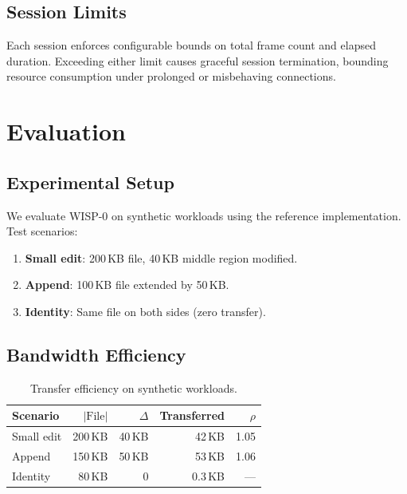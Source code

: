 \documentclass[11pt,twocolumn]{article}
\theoremstyle{definition}
\begin{document}
\subsection{Session Limits}

Each session enforces configurable bounds on total frame count and
elapsed duration. Exceeding either limit causes graceful session
termination, bounding resource consumption under prolonged or
misbehaving connections.


\section{Evaluation}
\label{sec:evaluation}

\subsection{Experimental Setup}

We evaluate WISP-0 on synthetic workloads using the reference
implementation. Test scenarios:

\begin{enumerate}
  \item \textbf{Small edit}: 200\,KB file, 40\,KB middle region modified.
  \item \textbf{Append}: 100\,KB file extended by 50\,KB.
  \item \textbf{Identity}: Same file on both sides (zero transfer).
\end{enumerate}

\subsection{Bandwidth Efficiency}

\begin{table}[t]
\centering
\caption{Transfer efficiency on synthetic workloads.}
\label{tab:efficiency}
\begin{tabular}{@{}lrrrr@{}}
\toprule
Scenario & $|\text{File}|$ & $\Delta$ & Transferred & $\rho$ \\
\midrule
Small edit & 200\,KB & 40\,KB  & 42\,KB & 1.05 \\
Append     & 150\,KB & 50\,KB  & 53\,KB & 1.06 \\
Identity   & 80\,KB  & 0       & 0.3\,KB & --- \\
\bottomrule
\end{tabular}
\end{table}
\end{document}
